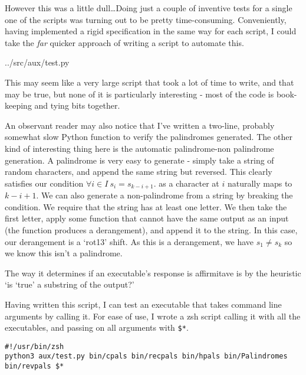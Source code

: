\documentclass[fleqn,a4paper,11pt]{article}
\begin{document}
\iffalse $ \fi %

    However this was a little dull\ldots Doing just a couple of inventive tests
    for a single one of the scripts was turning out to be pretty time-consuming.
    Conveniently, having implemented a rigid specification in the same way for
    each script, I could take the \emph{far} quicker approach of writing a
    script to automate this.


{../src/aux/test.py}

    This may seem like a very large script that took a lot of time to write, and
    that may be true, but none of it is particularly interesting - most of the
    code is book-keeping and tying bits together.

    An observant reader may also notice that I've written a two-line, probably
    somewhat slow Python function to verify the palindromes generated. The other
    kind of interesting thing here is the automatic palindrome-non palindrome
    generation. A palindrome is very easy to generate - simply take a string of
    random characters, and append the same string but reversed. This clearly
    satisfies our condition
    \( \forall i \in I\ s_i = s_{k - i + 1} \).
    as a character at \(i\) naturally maps to \(k - i + 1\). We can also
    generate a non-palindrome from a string by breaking the condition. We
    require that the string has at least one letter. We then take the first
    letter, apply some function that cannot have the same output as an input
    (the function produces a derangement), and append it to the string. In this
    case, our derangement is a `rot13' shift. As this is a derangement, we have
    \( s_1 \neq s_k \) so we know this isn't a palindrome.

    The way it determines if an executable's response is affirmitave is by the
    heuristic `is `true' a substring of the output?'

    Having written this script, I can test an executable that takes command
    line arguments by calling it. For ease of use, I wrote a zsh script calling
    it with all the executables, and passing on all arguments with \texttt{\$*}.

\begin{lstlisting}[caption=Test wrapper script]
#!/usr/bin/zsh
python3 aux/test.py bin/cpals bin/recpals bin/hpals bin/Palindromes bin/revpals $*
\end{lstlisting}
\iffalse $ \fi %
\end{document}

